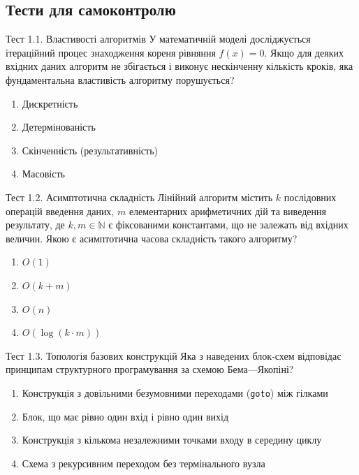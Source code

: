 \subsection*{Тести для самоконтролю}

\begin{pr}{Тест 1.1. Властивості алгоритмів}
У математичній моделі досліджується ітераційний процес знаходження кореня рівняння $f(x)=0$. Якщо для деяких вхідних даних алгоритм не збігається і виконує нескінченну кількість кроків, яка фундаментальна властивість алгоритму порушується?
\begin{enumerate}[label=\textbf{\Alph*.}]
	\item Дискретність
	\item Детермінованість
	\item Скінченність (результативність)
	\item Масовість
\end{enumerate}
\end{pr}

\begin{pr}{Тест 1.2. Асимптотична складність}
Лінійний алгоритм містить $k$ послідовних операцій введення даних, $m$ елементарних арифметичних дій та виведення результату, де $k, m \in \mathbb{N}$ є фіксованими константами, що не залежать від вхідних величин. Якою є асимптотична часова складність такого алгоритму?
\begin{enumerate}[label=\textbf{\Alph*.}]
	\item $O(1)$
	\item $O(k + m)$
	\item $O(n)$
	\item $O(\log(k \cdot m))$
\end{enumerate}
\end{pr}

\begin{pr}{Тест 1.3. Топологія базових конструкцій}
Яка з наведених блок-схем відповідає принципам структурного програмування за схемою Бема---Якопіні?
\begin{enumerate}[label=\textbf{\Alph*.}]
	\item Конструкція з довільними безумовними переходами (\texttt{goto}) між гілками
	\item Блок, що має рівно один вхід і рівно один вихід
	\item Конструкція з кількома незалежними точками входу в середину циклу
	\item Схема з рекурсивним переходом без термінального вузла
\end{enumerate}
\end{pr}

